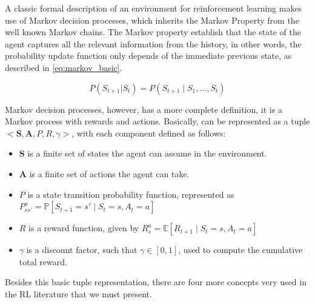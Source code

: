 A classic formal description of an environment for reinforcement learning makes use of Markov decision processes, which inherits the Markov Property from the well known Markov chains. The Markov property establish that the state of the agent captures all the relevant information from the history, in other words, the probability update function only depends of the immediate previous state, as described in \ref{eq:markov_basic}.

\begin{equation}
P(S_{t+1} | S_t) = P(S_{t+1} \mid S_1, ..., S_t)
\label{eq:markov_basic}
\end{equation}

Markov decision processes, however, has a more complete definition, it is a Markov process with rewards and actions. Basically, can be represented as a tuple $<\textbf{S}, \textbf{A}, P, R, \gamma>$, with each component defined as follows:
\begin{itemize}
\item
	$\textbf{S}$ is a finite set of states the agent can assume in the environment.
\item
	$\textbf{A}$ is a finite set of actions the agent can take.
\item
	$P$ is a state transition probability function, represented as $P_{ss'}^a = \mathbb{P}[S_{t+1}=s' \mid S_t = s, A_t = a]$
\item
	$R$ is a reward function, given by $R_s^a = \mathbb{E}[R_{t+1} \mid S_t = s, A_t = a]$
\item
	$\gamma$ is a discount factor, such that $\gamma \in [0,1]$, used to compute the cumulative total reward.
	
\end{itemize}

Besides this basic tuple representation, there are four more concepts very used in the RL literature that we must present.

